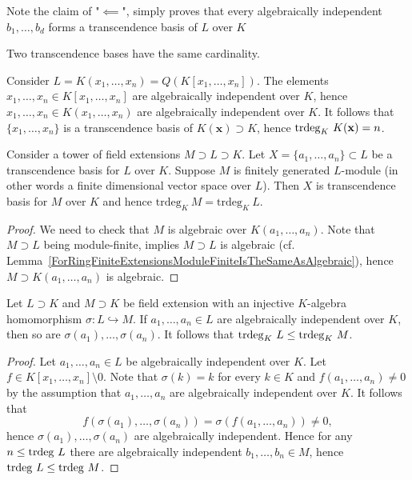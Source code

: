 \begin{remark}
    Note the claim of "$\impliedby$", simply proves that every algebraically independent $b_1,\dots,b_d$ forms a transcendence basis of $L$ over $K$ 
\end{remark}
\begin{corollary}
    Two transcendence bases have the same cardinality. 
\end{corollary}
\begin{example}\label{TranscendenceDegreeOfQuotientFieldOfPolynomialRing}
    Consider $L=K(x_1,\dots,x_n)=Q(K[x_1,\dots,x_n])$. The elements $x_1,\dots,x_n\in K[x_1,\dots,x_n]$ are algebraically independent over $K$, hence $x_1,\dots,x_n\in K(x_1,\dots,x_n)$ are algebraically independent over $K$. It follows that $\{x_1,\dots,x_n\}$ is a transcendence basis of $K(\mathbf{x})\supset K$, hence $\mathrm{trdeg }_K \ K(\mathbf{x}) = n$. 
\end{example}
\begin{corollary}\label{TrcBasisExtendsWhenExtFinGen}
    Consider a tower of field extensions $M\supset L\supset K$. Let $X=\{a_1,\dots,a_n\}\subset L$ be a transcendence basis for $L$ over $K$. Suppose $M$ is finitely generated $L$-module (in other words a finite dimensional vector space over $L$). Then $X$ is transcendence basis for $M$ over $K$ and hence $\text{trdeg}_K\ M = \text{trdeg}_K\ L$.
\end{corollary}
\begin{proof}
    We need to check that $M$ is algebraic over $K(a_1,\dots,a_n)$. Note that $M\supset L$ being module-finite, implies $M\supset L$ is algebraic (cf. Lemma~\ref{ForRingFiniteExtensionsModuleFiniteIsTheSameAsAlgebraic}), hence $M\supset K(a_1,\dots,a_n)$ is algebraic. 
\end{proof}
\begin{lemma}\label{InjectiveKAlgebraHomomorphismImpliesSmallerTranscendenceDegree}
    Let $L\supset K$ and $M\supset K$ be field extension with an injective $K$-algebra homomorphism $\sigma: L\hookrightarrow M$. If $a_1,\dots,a_n\in L$ are algebraically independent over $K$, then so are $\sigma(a_1),\dots,\sigma(a_n)$. It follows that $\trdeg_K\ L \leq \trdeg_K\ M$.\\
\end{lemma}
\begin{proof}
    Let $a_1,\dots,a_n\in L$ be algebraically independent over $K$.  Let $f\in K[x_1,\dots,x_n]\setminus 0$. Note that $\sigma(k)=k$ for every $k\in K$ and $f(a_1,\dots,a_n)\neq 0$ by the assumption that $a_1,\dots, a_n$ are algebraically independent over $K$. It follows that
    $$f(\sigma(a_1),\dots,\sigma(a_n))= \sigma(f(a_1,\dots,a_n))\neq 0,$$
    hence $\sigma(a_1),\dots,\sigma(a_n)$ are algebraically independent. Hence for any $n\leq \mathrm{trdeg } \ L$ there are algebraically independent $b_1,\dots,b_n\in M$, hence $\mathrm{trdeg }\ L \leq \mathrm{trdeg }\ M$.
\end{proof}
